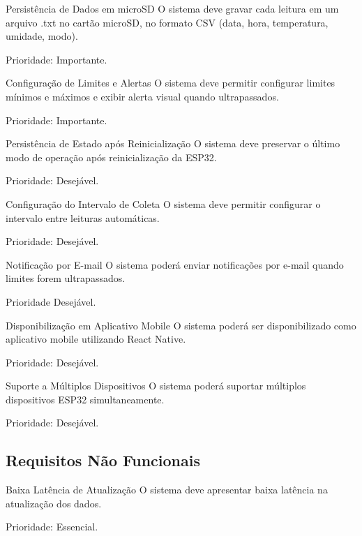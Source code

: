 \begin{rfreq}{Persistência de Dados em microSD}
O sistema deve gravar cada leitura em um arquivo .txt no cartão microSD, no formato CSV (data, hora, temperatura, umidade, modo).

Prioridade: Importante.
\end{rfreq}

\begin{rfreq}{Configuração de Limites e Alertas}
O sistema deve permitir configurar limites mínimos e máximos e exibir alerta visual quando ultrapassados.

Prioridade:  Importante.
\end{rfreq}

\begin{rfreq}{Persistência de Estado após Reinicialização}
O sistema deve preservar o último modo de operação após reinicialização da ESP32.

Prioridade: Desejável.
\end{rfreq}

\begin{rfreq}{Configuração do Intervalo de Coleta}
O sistema deve permitir configurar o intervalo entre leituras automáticas.

Prioridade:  Desejável.
\end{rfreq}

\begin{rfreq}{Notificação por E-mail}
O sistema poderá enviar notificações por e-mail quando limites forem ultrapassados.

Prioridade Desejável.
\end{rfreq}

\begin{rfreq}{Disponibilização em Aplicativo Mobile}
O sistema poderá ser disponibilizado como aplicativo mobile utilizando React Native.

Prioridade: Desejável.
\end{rfreq}

\begin{rfreq}{Suporte a Múltiplos Dispositivos}
O sistema poderá suportar múltiplos dispositivos ESP32 simultaneamente.

Prioridade: Desejável.
\end{rfreq}
\subsection{Requisitos Não Funcionais}

\begin{nfreq}{Baixa Latência de Atualização}
O sistema deve apresentar baixa latência na atualização dos dados.

Prioridade:  Essencial.
\end{nfreq}

